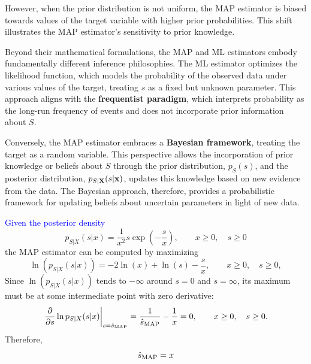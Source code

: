 However, when the prior distribution is not uniform, the MAP estimator is biased towards values of the target variable with higher prior probabilities. This shift illustrates the MAP estimator's sensitivity to prior knowledge.

Beyond their mathematical formulations, the MAP and ML estimators embody fundamentally different inference philosophies. The ML estimator optimizes the likelihood function, which models the probability of the observed data under various values of the target, treating $s$ as a fixed but unknown parameter. This approach aligns with the \textbf{frequentist paradigm}, which interprets probability as the long-run frequency of events and does not incorporate prior information about $S$.

Conversely, the MAP estimator embraces a \textbf{Bayesian framework}, treating the target as a random variable. This perspective allows the incorporation of prior knowledge or beliefs about $S$ through the prior distribution, $p_S(s)$, and the posterior distribution, $p_{{S|\bf X}}(s|{\bf x})$, updates this knowledge based on new evidence from the data. The Bayesian approach, therefore, provides a probabilistic framework for updating beliefs about uncertain parameters in light of new data.

\begin{example}[\textcolor{blue}{MAP estimation}]
\textcolor{blue}{Given the posterior density}  
\begin{equation}
p_{S|X}(s|x) = \frac{1}{x^2} s \exp\left(-\frac{s}{x}\right), \qquad  x\ge 0,\quad s \ge 0
\end{equation}
the MAP estimator can be computed by maximizing
\begin{equation}
\ln(p_{S|X}(s|x)) = -2\ln(x) + \ln(s)-\frac{s}{x}, \qquad  x\ge 0,\quad s \ge 0,
\end{equation}
Since $\ln(p_{S|X}(s|x))$ tends to $-\infty$ around $s=0 $ and $s=\infty$, its maximum must be at some intermediate point with zero derivative:
\begin{equation}
\left.\frac{\partial}{\partial s} \ln p_{S|X}(s|x)\right|_{s=\hat{s}_\text{MAP}} 
	= \frac{1}{\hat{s}_\text{MAP}} - \frac{1}{x} 
	= 0, \qquad  x\ge 0, \quad s \ge 0.
\end{equation}
Therefore,
\begin{equation}
\hat{s}_\text{MAP} = x
\end{equation}
\end{example}   %

